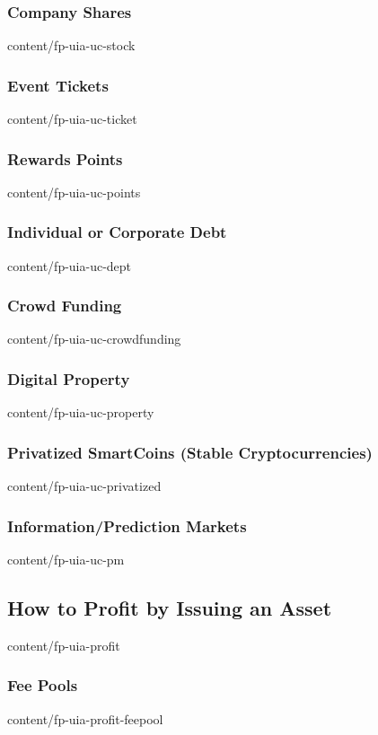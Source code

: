 \documentclass[conference,final,10pt,a4paper]{IEEEtran}
\begin{document}
\subsubsection { Company Shares                                  }  { content/fp-uia-uc-stock        } 
\subsubsection { Event Tickets                                   }  { content/fp-uia-uc-ticket       } 
\subsubsection { Rewards Points                                  }  { content/fp-uia-uc-points       } 
\subsubsection { Individual or Corporate Debt                    }  { content/fp-uia-uc-dept         } 
\subsubsection { Crowd Funding                                   }  { content/fp-uia-uc-crowdfunding } 
\subsubsection { Digital Property                                }  { content/fp-uia-uc-property     } 
\subsubsection { Privatized SmartCoins (Stable Cryptocurrencies) }  { content/fp-uia-uc-privatized   } 
\subsubsection { Information/Prediction Markets                  }  { content/fp-uia-uc-pm           } 
\subsection    { How to Profit by Issuing an Asset               }  { content/fp-uia-profit          } 
\subsubsection { Fee Pools                                       }  { content/fp-uia-profit-feepool  } 
\end{document}
